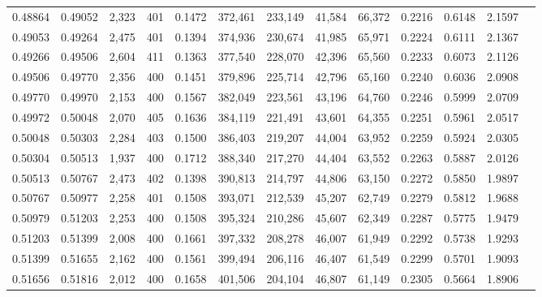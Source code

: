 \begin{tabular}{rrrrrrrrrrrrr}
0.48864 & 0.49052 &  2,323 &   401 &                                     0.1472 & 372,461 & 233,149 &  41,584 &  66,372 & 0.2216 & 0.6148 & 2.1597 \\
0.49053 & 0.49264 &  2,475 &   401 &                                     0.1394 & 374,936 & 230,674 &  41,985 &  65,971 & 0.2224 & 0.6111 & 2.1367 \\
0.49266 & 0.49506 &  2,604 &   411 &                                     0.1363 & 377,540 & 228,070 &  42,396 &  65,560 & 0.2233 & 0.6073 & 2.1126 \\
0.49506 & 0.49770 &  2,356 &   400 &                                     0.1451 & 379,896 & 225,714 &  42,796 &  65,160 & 0.2240 & 0.6036 & 2.0908 \\
0.49770 & 0.49970 &  2,153 &   400 &                                     0.1567 & 382,049 & 223,561 &  43,196 &  64,760 & 0.2246 & 0.5999 & 2.0709 \\
0.49972 & 0.50048 &  2,070 &   405 &                                     0.1636 & 384,119 & 221,491 &  43,601 &  64,355 & 0.2251 & 0.5961 & 2.0517 \\
0.50048 & 0.50303 &  2,284 &   403 &                                     0.1500 & 386,403 & 219,207 &  44,004 &  63,952 & 0.2259 & 0.5924 & 2.0305 \\
0.50304 & 0.50513 &  1,937 &   400 &                                     0.1712 & 388,340 & 217,270 &  44,404 &  63,552 & 0.2263 & 0.5887 & 2.0126 \\
0.50513 & 0.50767 &  2,473 &   402 &                                     0.1398 & 390,813 & 214,797 &  44,806 &  63,150 & 0.2272 & 0.5850 & 1.9897 \\
0.50767 & 0.50977 &  2,258 &   401 &                                     0.1508 & 393,071 & 212,539 &  45,207 &  62,749 & 0.2279 & 0.5812 & 1.9688 \\
0.50979 & 0.51203 &  2,253 &   400 &                                     0.1508 & 395,324 & 210,286 &  45,607 &  62,349 & 0.2287 & 0.5775 & 1.9479 \\
0.51203 & 0.51399 &  2,008 &   400 &                                     0.1661 & 397,332 & 208,278 &  46,007 &  61,949 & 0.2292 & 0.5738 & 1.9293 \\
0.51399 & 0.51655 &  2,162 &   400 &                                     0.1561 & 399,494 & 206,116 &  46,407 &  61,549 & 0.2299 & 0.5701 & 1.9093 \\
0.51656 & 0.51816 &  2,012 &   400 &                                     0.1658 & 401,506 & 204,104 &  46,807 &  61,149 & 0.2305 & 0.5664 & 1.8906 \\

\end{tabular}
